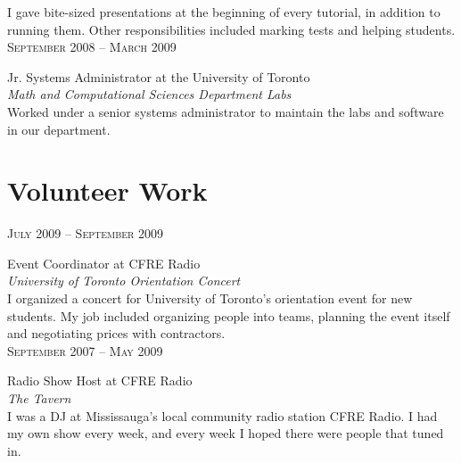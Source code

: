 \documentclass[10pt]{article}
\begin{document}
\begin{minipage}[t]{0.5\textwidth}
    \normalsize{I gave bite-sized presentations at the beginning of every 
    tutorial, in addition to running them. Other responsibilities included
    marking tests and helping students.}\\[10pt]

    \raggedleft
    \textsc{\normalsize September 2008 -- March 2009}\par

    \raggedright\large Jr. Systems Administrator at the University of Toronto\\
    \emph{Math and Computational Sciences Department Labs}\\[5pt]

    \normalsize{Worked under a senior systems administrator to maintain the
    labs and software in our department.}\\[10pt]

\section{Volunteer Work}
    \raggedleft
    \textsc{\normalsize July 2009 -- September 2009}\par

    \raggedright\large Event Coordinator at CFRE Radio\\
    \emph{University of Toronto Orientation Concert}\\[5pt]

    \normalsize{I organized a concert for University of Toronto's orientation
    event for new students. My job included organizing people into teams, 
    planning the event itself and negotiating prices with contractors.}\\[10pt]

    \raggedleft
    \textsc{\normalsize September 2007 -- May 2009}\par

    \raggedright\large Radio Show Host at CFRE Radio\\
    \emph{The Tavern}\\[5pt]

    \normalsize{I was a DJ at Mississauga's local community radio station
    CFRE Radio. I had my own show every week, and every week I hoped there
    were people that tuned in.}\\[10pt]

\end{minipage}
\hfill
\end{document}

